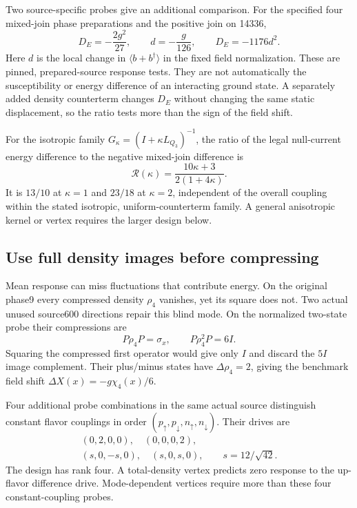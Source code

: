 Two source-specific probes give an additional comparison. For the specified
four mixed-join phase preparations and the positive join on 14336,
\begin{equation}
D_E=-\frac{2g^2}{27},\qquad d=-\frac{g}{126},\qquad
D_E=-1176d^2.
\label{eq:response-relation-new}
\end{equation}
Here $d$ is the local change in $\langle b+b^\dagger\rangle$ in the fixed
field normalization. These are pinned, prepared-source response tests.
They are not automatically the susceptibility or energy difference of an
interacting ground state. A separately added density counterterm changes
$D_E$ without changing the same static displacement, so the ratio tests
more than the sign of the field shift.

For the isotropic family $G_\kappa=(I+\kappa L_{Q_3})^{-1}$, the ratio of
the legal null-current energy difference to the negative mixed-join
difference is
\begin{equation}
\mathcal R(\kappa)=\frac{10\kappa+3}{2(1+4\kappa)}.
\end{equation}
It is $13/10$ at $\kappa=1$ and $23/18$ at $\kappa=2$, independent of the
overall coupling within the stated isotropic, uniform-counterterm family.
A general anisotropic kernel or vertex requires the larger design below.

\subsection{Use full density images before compressing}

Mean response can miss fluctuations that contribute energy. On the original
phase9 every compressed density $\rho_4$ vanishes, yet its square does not.
Two actual unused source600 directions repair this blind mode. On the
normalized two-state probe their compressions are
\begin{equation}
P\rho_4P=\sigma_x,\qquad P\rho_4^2P=6I.
\end{equation}
Squaring the compressed first operator would give only $I$ and discard the
$5I$ image complement. Their plus/minus states have $\Delta\rho_4=2$,
giving the benchmark field shift
$\Delta X(x)=-g\chi_4(x)/6$.

Four additional probe combinations in the same actual source distinguish
constant flavor couplings in order
$(p_\uparrow,p_\downarrow,n_\uparrow,n_\downarrow)$. Their drives are
\begin{equation}
\begin{gathered}
(0,2,0,0),\quad(0,0,0,2),\\
(s,0,-s,0),\quad(s,0,s,0),\qquad s=12/\sqrt{42}.
\end{gathered}
\end{equation}
The design has rank four. A total-density vertex predicts zero response to
the up-flavor difference drive. Mode-dependent vertices require more than
these four constant-coupling probes.

